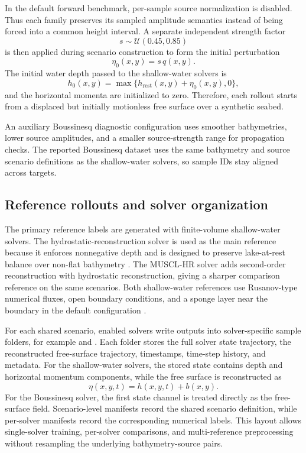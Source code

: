 In the default forward benchmark, per-sample source normalization is disabled. Thus each family preserves its sampled amplitude semantics instead of being forced into a common height interval. A separate independent strength factor
\[
s\sim\mathcal{U}(0.45, 0.85)
\]
is then applied during scenario construction to form the initial perturbation
\[
\eta_0(x, y) = s\, q(x, y).
\]
The initial water depth passed to the shallow-water solvers is
\[
h_0(x,y)=\max\{h_{\mathrm{rest}}(x,y)+\eta_0(x,y),0\},
\]
and the horizontal momenta are initialized to zero. Therefore, each rollout starts from a displaced but initially motionless free surface over a synthetic seabed.

An auxiliary Boussinesq diagnostic configuration uses smoother bathymetries, lower source amplitudes, and a smaller source-strength range for propagation checks. The reported Boussinesq dataset uses the same bathymetry and source scenario definitions as the shallow-water solvers, so sample IDs stay aligned across targets.

\subsection{Reference rollouts and solver organization}
\label{subsec:reference-rollouts}

The primary reference labels are generated with finite-volume shallow-water solvers. The hydrostatic-reconstruction solver is used as the main reference because it enforces nonnegative depth and is designed to preserve lake-at-rest balance over non-flat bathymetry \citep{audusse2004hydrostatic}. The MUSCL-HR solver adds second-order reconstruction with hydrostatic reconstruction, giving a sharper comparison reference on the same scenarios. Both shallow-water references use Rusanov-type numerical fluxes, open boundary conditions, and a sponge layer near the boundary in the default configuration \citep{leveque2002finite,toro2009riemann,clain2016secondorder}.

For each shared scenario, enabled solvers write outputs into solver-specific sample folders, for example  and . Each folder stores the full solver state trajectory, the reconstructed free-surface trajectory, timestamps, time-step history, and metadata. For the shallow-water solvers, the stored state contains depth and horizontal momentum components, while the free surface is reconstructed as
\[
\eta(x,y,t)=h(x,y,t)+b(x,y).
\]
For the Boussinesq solver, the first state channel is treated directly as the free-surface field. Scenario-level manifests record the shared scenario definition, while per-solver manifests record the corresponding numerical labels. This layout allows single-solver training, per-solver comparisons, and multi-reference preprocessing without resampling the underlying bathymetry-source pairs.

